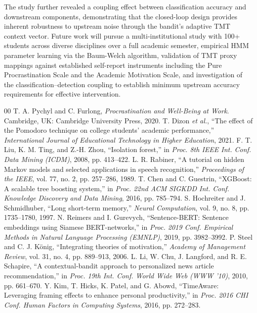\documentclass[conference]{IEEEtran}
\begin{document}
The study further revealed a coupling effect between classification accuracy and downstream components, demonstrating that the closed-loop design provides inherent robustness to upstream noise through the bandit's adaptive TMT context vector. Future work will pursue a multi-institutional study with 100+ students across diverse disciplines over a full academic semester, empirical HMM parameter learning via the Baum-Welch algorithm, validation of TMT proxy mappings against established self-report instruments including the Pure Procrastination Scale \cite{b12} and the Academic Motivation Scale, and investigation of the classification--detection coupling to establish minimum upstream accuracy requirements for effective intervention.

\begin{thebibliography}{00}
 T. A. Pychyl and C. Furlong, \textit{Procrastination and Well-Being at Work}. Cambridge, UK: Cambridge University Press, 2020.
 T. Dizon \textit{et al.}, ``The effect of the Pomodoro technique on college students' academic performance,'' \textit{International Journal of Educational Technology in Higher Education}, 2021.
 F. T. Liu, K. M. Ting, and Z.-H. Zhou, ``Isolation forest,'' in \textit{Proc. 8th IEEE Int. Conf. Data Mining (ICDM)}, 2008, pp. 413--422.
 L. R. Rabiner, ``A tutorial on hidden Markov models and selected applications in speech recognition,'' \textit{Proceedings of the IEEE}, vol. 77, no. 2, pp. 257--286, 1989.
 T. Chen and C. Guestrin, ``XGBoost: A scalable tree boosting system,'' in \textit{Proc. 22nd ACM SIGKDD Int. Conf. Knowledge Discovery and Data Mining}, 2016, pp. 785--794.
 S. Hochreiter and J. Schmidhuber, ``Long short-term memory,'' \textit{Neural Computation}, vol. 9, no. 8, pp. 1735--1780, 1997.
 N. Reimers and I. Gurevych, ``Sentence-BERT: Sentence embeddings using Siamese BERT-networks,'' in \textit{Proc. 2019 Conf. Empirical Methods in Natural Language Processing (EMNLP)}, 2019, pp. 3982--3992.
 P. Steel and C. J. K\"{o}nig, ``Integrating theories of motivation,'' \textit{Academy of Management Review}, vol. 31, no. 4, pp. 889--913, 2006.
 L. Li, W. Chu, J. Langford, and R. E. Schapire, ``A contextual-bandit approach to personalized news article recommendation,'' in \textit{Proc. 19th Int. Conf. World Wide Web (WWW '10)}, 2010, pp. 661--670.
 Y. Kim, T. Hicks, K. Patel, and G. Abowd, ``TimeAware: Leveraging framing effects to enhance personal productivity,'' in \textit{Proc. 2016 CHI Conf. Human Factors in Computing Systems}, 2016, pp. 272--283.

\end{thebibliography}
\end{document}
